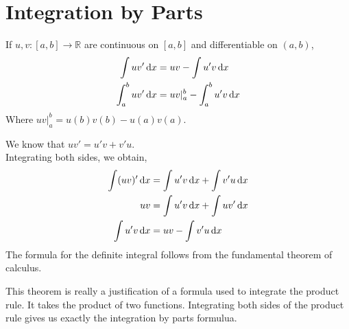 \documentclass[12pt]{article}
\begin{document}
\section{Integration by Parts}
\begin{theo}{}
If \(u, v: [a, b] \to \mathbb R\) are continuous on \([a, b]\) and differentiable on \((a, b)\),
\begin{align*}
    \displaystyle\int uv' \,\mathrm{d} x &= uv - \displaystyle\int u'v \,\mathrm{d} x\\
    \displaystyle\int_a^b uv' \,\mathrm{d} x &= uv\rvert_a^b - \displaystyle\int_a^b u'v \,\mathrm{d} x 
\end{align*}    
Where \(uv\rvert_a^b = u(b)v(b) - u(a)v(a)\).\\
\end{theo}
\begin{prf}{}
We know that \(uv' = u'v + v'u\).\\
Integrating both sides, we obtain,
\begin{align*}
    \displaystyle\int (uv)' \,\mathrm{d} x &= \displaystyle\int u'v\,\mathrm{d} x + \displaystyle\int v'u \,\mathrm{d} x\\
    uv &= \displaystyle\int u'v\,\mathrm{d} x + \displaystyle\int uv' \,\mathrm{d} x\\
    \displaystyle\int u'v \,\mathrm{d} x &= uv - \displaystyle\int v'u \,\mathrm{d} x
\end{align*}    
The formula for the definite integral follows from the fundamental theorem of calculus.\\
\end{prf}
\newpage
\begin{explanation}{}
    This theorem is really a justification of a formula used to integrate the product rule. It takes the product of two functions. Integrating both sides of the product rule gives us exactly the integration by parts formulua.
\end{explanation}
\end{document}

